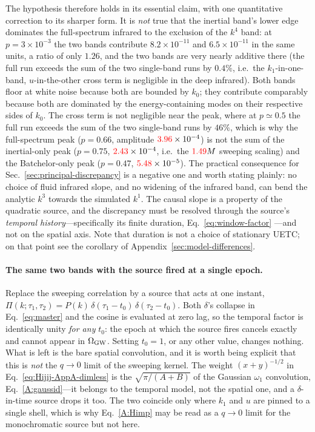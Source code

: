 \documentclass[10pt,prd,aps,nobibnotes,superscriptaddress,preprintnumbers,notitlepage]{revtex4-1}
\newcommand{\add}[1]{{\color{red}#1}}
\newcommand{\add}[1]{#1}
\begin{document}
The hypothesis therefore holds in its essential claim, with one quantitative
correction to its sharper form. It is \emph{not} true that the inertial band's
lower edge dominates the full-spectrum infrared to the exclusion of the $k^4$
band: at $p=3\times10^{-3}$ the two bands contribute $8.2\times10^{-11}$ and
$6.5\times10^{-11}$ in the same units, a ratio of only $1.26$, and the two bands
are very nearly additive there (the full run exceeds the sum of the two
single-band runs by $0.4\%$, i.e.\ the $k_1$-in-one-band, $u$-in-the-other cross
term is negligible in the deep infrared). Both bands floor at white noise because
both are bounded by $k_0$; they contribute comparably because both are dominated
by the energy-containing modes on their respective sides of $k_0$. The cross term
is not negligible near the peak, where at $p\simeq0.5$ the full run exceeds the sum
of the two single-band runs by $46\%$, which is why the full-spectrum peak ($p=0.66$, amplitude
$\add{3.96}\times10^{-4}$) is not the sum of the inertial-only peak ($p=0.75$,
$\add{2.43}\times10^{-4}$, i.e.\ the $\add{1.49}M$ sweeping scaling) and the Batchelor-only
peak ($p=0.47$, $\add{5.48}\times10^{-5}$). The practical consequence for
Sec.~\ref{sec:principal-discrepancy} is a negative one and worth stating plainly:
no choice of fluid infrared slope, and no widening of the infrared band, can bend
the analytic $k^3$ towards the simulated $k^1$. The causal slope is a property of
the quadratic source, and the discrepancy must be resolved through the source's
\emph{temporal history}---specifically its finite duration, Eq.~\eqref{eq:window-factor}
\cite{RoperPol:2022iel,RoperPol:2023dzg}---and not on the spatial axis. Note that
duration is not a choice of stationary UETC; on that point see the corollary of
Appendix~\ref{sec:model-differences}.

\paragraph{The same two bands with the source fired at a single epoch.}
Replace the sweeping correlation by a source that acts at one instant,
$\Pi(k;\tau_1,\tau_2)=P(k)\,\delta(\tau_1-t_0)\,\delta(\tau_2-t_0)$. Both
$\delta$'s collapse in Eq.~\eqref{eq:master} and the cosine is evaluated at zero
lag, so the temporal factor is identically unity \emph{for any} $t_0$: the epoch
at which the source fires cancels exactly and cannot appear in
$\Omega_{\rm GW}$. Setting $t_0=1$, or any other value, changes nothing. What is
left is the bare spatial convolution, and it is worth being explicit that this
is \emph{not} the $q\to0$ limit of the sweeping kernel. The weight
$(x+y)^{-1/2}$ in Eq.~\eqref{eq:Hijij-AppA-dimless} is the
$\sqrt{\pi/(A+B)}$ of the Gaussian $\omega_1$ convolution,
Eq.~\eqref{A:gaussid}---it belongs to the temporal model, not the spatial one,
and a $\delta$-in-time source drops it too. The two coincide only where $k_1$
and $u$ are pinned to a single shell, which is why
Eq.~\eqref{A:Himp} may be read as a $q\to0$ limit for the monochromatic source
but not here.
\end{document}

